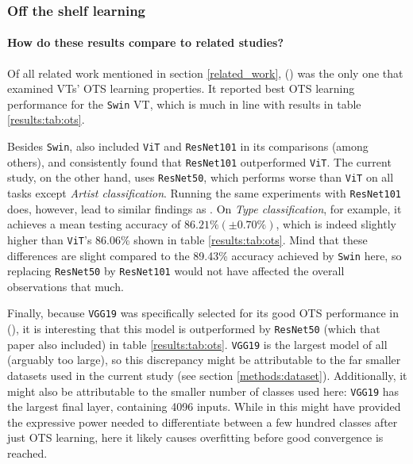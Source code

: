 \subsubsection{Off the shelf learning}

\paragraph{How do these results compare to related studies?}
Of all related work mentioned in section \ref{related_work}, \citeauthor{zhou2021convnets} (\citeyear{zhou2021convnets}) was the only one that examined VTs' OTS learning properties. It reported best OTS learning performance for the \texttt{Swin} VT, which is much in line with results in table \ref{results:tab:ots}.

Besides \texttt{Swin}, \citeauthor{zhou2021convnets} also included \texttt{ViT} and \texttt{ResNet101} in its comparisons (among others), and consistently found that \texttt{ResNet101} outperformed \texttt{ViT}. The current study, on the other hand, uses \texttt{ResNet50}, which performs worse than \texttt{ViT} on all tasks except \textit{Artist classification}. Running the same experiments with \texttt{ResNet101} does, however, lead to similar findings as \citeauthor{zhou2021convnets}. On \textit{Type classification}, for example, it achieves a mean testing accuracy of  $86.21\% (\pm 0.70\%)$, which is indeed slightly higher than \texttt{ViT}'s 86.06\% shown in table \ref{results:tab:ots}. Mind that these differences are slight compared to the 89.43\% accuracy achieved by \texttt{Swin} here, so replacing \texttt{ResNet50} by \texttt{ResNet101} would not have affected the overall observations that much.

Finally, because \texttt{VGG19} was specifically selected for its good OTS performance in \citeauthor{sabatelli2018deep} (\citeyear{sabatelli2018deep}), it is interesting that this model is outperformed by \texttt{ResNet50} (which that paper also included) in table \ref{results:tab:ots}. \texttt{VGG19} is the largest model of all (arguably too large), so this discrepancy might be attributable to the far smaller datasets used in the current study (see section \ref{methods:dataset}). Additionally, it might also be attributable to the smaller number of classes used here: \texttt{VGG19} has the largest final layer, containing 4096 inputs. While in \citeauthor{sabatelli2018deep} this might have provided the expressive power needed to differentiate between a few hundred classes after just OTS learning, here it likely causes overfitting before good convergence is reached.

